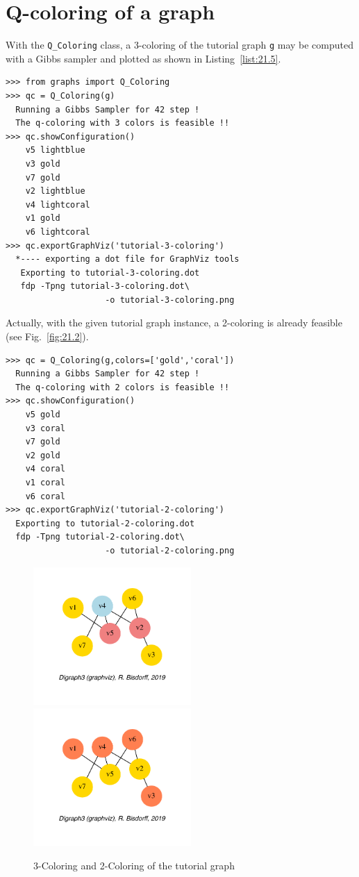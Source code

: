 \section{Q-coloring of a graph}
\label{25.2}

With the \texttt{Q\_Coloring} class, a 3-coloring of the tutorial graph \texttt{g} may be computed with a Gibbs sampler \citep{GEM-1984} and plotted as shown in Listing~\vref{list:21.5}.
\begin{lstlisting}[caption={Computing a 3-coloring of the random graph \texttt{g}},label=list:21.5]
>>> from graphs import Q_Coloring
>>> qc = Q_Coloring(g)
  Running a Gibbs Sampler for 42 step !
  The q-coloring with 3 colors is feasible !!
>>> qc.showConfiguration()
    v5 lightblue
    v3 gold
    v7 gold
    v2 lightblue
    v4 lightcoral
    v1 gold
    v6 lightcoral
>>> qc.exportGraphViz('tutorial-3-coloring')
  *---- exporting a dot file for GraphViz tools
   Exporting to tutorial-3-coloring.dot
   fdp -Tpng tutorial-3-coloring.dot\
                    -o tutorial-3-coloring.png
\end{lstlisting}

Actually, with the given tutorial graph instance, a 2-coloring is already feasible (see Fig.~\vref{fig:21.2}).
\begin{lstlisting}
>>> qc = Q_Coloring(g,colors=['gold','coral'])
  Running a Gibbs Sampler for 42 step !
  The q-coloring with 2 colors is feasible !!
>>> qc.showConfiguration()
    v5 gold
    v3 coral
    v7 gold
    v2 gold
    v4 coral
    v1 coral
    v6 coral
>>> qc.exportGraphViz('tutorial-2-coloring')
  Exporting to tutorial-2-coloring.dot
  fdp -Tpng tutorial-2-coloring.dot\
                    -o tutorial-2-coloring.png
\end{lstlisting}
\begin{figure}[ht]
\includegraphics[width=6cm]{Figures/21-2-tutorial-3-coloring.pdf}\hfill
\includegraphics[width=6cm]{Figures/21-2-tutorial-2-coloring.pdf}
\caption{3-Coloring and 2-Coloring of the tutorial graph} 
\label{fig:21.2}       %
\end{figure}

